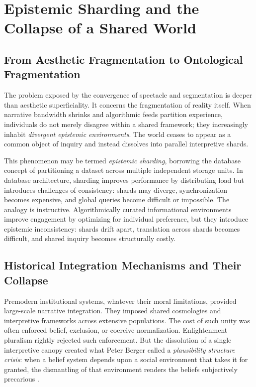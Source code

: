 \documentclass[11pt]{article}
\begin{document}
\section{Epistemic Sharding and the Collapse of a Shared World}
\label{sec:sharding}

\subsection{From Aesthetic Fragmentation to Ontological Fragmentation}

The problem exposed by the convergence of spectacle and segmentation is deeper than aesthetic superficiality. It concerns the fragmentation of reality itself. When narrative bandwidth shrinks and algorithmic feeds partition experience, individuals do not merely disagree within a shared framework; they increasingly inhabit \emph{divergent epistemic environments}. The world ceases to appear as a common object of inquiry and instead dissolves into parallel interpretive shards.

This phenomenon may be termed \emph{epistemic sharding}, borrowing the database concept of partitioning a dataset across multiple independent storage units. In database architecture, sharding improves performance by distributing load but introduces challenges of consistency: shards may diverge, synchronization becomes expensive, and global queries become difficult or impossible. The analogy is instructive. Algorithmically curated informational environments improve engagement by optimizing for individual preference, but they introduce epistemic inconsistency: shards drift apart, translation across shards becomes difficult, and shared inquiry becomes structurally costly.

\subsection{Historical Integration Mechanisms and Their Collapse}

Premodern institutional systems, whatever their moral limitations, provided large-scale narrative integration. They imposed shared cosmologies and interpretive frameworks across extensive populations. The cost of such unity was often enforced belief, exclusion, or coercive normalization. Enlightenment pluralism rightly rejected such enforcement. But the dissolution of a single interpretive canopy created what Peter Berger called a \emph{plausibility structure crisis}: when a belief system depends upon a social environment that takes it for granted, the dismantling of that environment renders the beliefs subjectively precarious \citep{Berger1967}.
\end{document}
